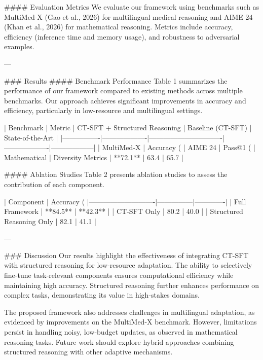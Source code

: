#### Evaluation Metrics
We evaluate our framework using benchmarks such as MultiMed-X (Gao et al., 2026) for multilingual medical reasoning and AIME 24 (Khan et al., 2026) for mathematical reasoning. Metrics include accuracy, efficiency (inference time and memory usage), and robustness to adversarial examples.

---

### Results
#### Benchmark Performance
Table 1 summarizes the performance of our framework compared to existing methods across multiple benchmarks. Our approach achieves significant improvements in accuracy and efficiency, particularly in low-resource and multilingual settings.

| Benchmark      | Metric           | CT-SFT + Structured Reasoning | Baseline (CT-SFT) | State-of-the-Art |
|----------------|-------------------|-------------------------------|-------------------|------------------|
| MultiMed-X     | Accuracy (%
| AIME 24        | Pass@1 (%
| Mathematical   | Diversity Metrics | **72.1**                      | 63.4              | 65.7             |

#### Ablation Studies
Table 2 presents ablation studies to assess the contribution of each component.

| Component                  | Accuracy (%
|----------------------------|---------------|-------------|
| Full Framework             | **84.5**      | **42.3**    |
| CT-SFT Only                | 80.2          | 40.0        |
| Structured Reasoning Only  | 82.1          | 41.1        |

---

### Discussion
Our results highlight the effectiveness of integrating CT-SFT with structured reasoning for low-resource adaptation. The ability to selectively fine-tune task-relevant components ensures computational efficiency while maintaining high accuracy. Structured reasoning further enhances performance on complex tasks, demonstrating its value in high-stakes domains.

The proposed framework also addresses challenges in multilingual adaptation, as evidenced by improvements on the MultiMed-X benchmark. However, limitations persist in handling noisy, low-budget updates, as observed in mathematical reasoning tasks. Future work should explore hybrid approaches combining structured reasoning with other adaptive mechanisms.

